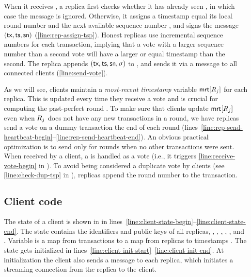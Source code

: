 When it receives  \msgwrite{\tx}, a replica first checks whether it has already seen \tx, in which case the message is ignored. Otherwise, it assigns \tx a timestamp \tsp equal its local round number and the next available sequence number \sn, and signs the message $(\textsf{tx}, \textsf{ts}, \textsf{sn})$ (\cref{line:rep-assign-tsp}).
Honest replicas use incremental sequence numbers for each transaction, implying that a vote with a larger sequence number than a second vote will have a larger or equal timestamp than the second.
The replica appends $(\textsf{tx}, \textsf{ts}, \textsf{sn}, \sigma)$ to \repLog, and sends it via a  message to all connected clients (\cref{line:send-vote}).

As we will see, clients maintain a \emph{most-recent timestamp} variable $\textsf{mrt}[R_j]$ for each replica. This is updated every time they receive a vote and is crucial for computing the past-perfect round \rperf.
To make sure that clients update $\textsf{mrt}[R_j]$ even when $R_j$ does not have any new transactions in a round,
we have replicas send a vote on a dummy \heartBeat transaction the end of each round (lines~\ref{line:rep-send-heartbeat-begin}--\ref{line:rep-send-heartbeat-end}).
An obvious practical optimization is to send \heartBeat only for rounds when no other transactions were sent.
When received by a client, a \heartBeat is handled as a vote (i.e., it triggers \cref{line:receive-vote-begin} in ). To avoid being considered a duplicate vote by clients (see \cref{line:check-dup-tsp} in ), replicas append the round number to the \heartBeat transaction.


\subsection{Client code}




The state of a client is shown in  in lines~\ref{line:client-state-begin}--\ref{line:client-state-end}.
The state contains the identifiers and public keys of all replicas, \mrt, \nextsn, \tsps, \Pod, \ppcert, and \txcert.
Variable \tsps is a map from transactions \tx to a map from replicas \rep to timestamps \tsp.
The state gets initialized in lines~\ref{line:client-init-start}--\ref{line:client-init-end}.
At initialization the client also sends a \msgconnect{} message to each replica, which initiates a streaming connection from the replica to the client.

